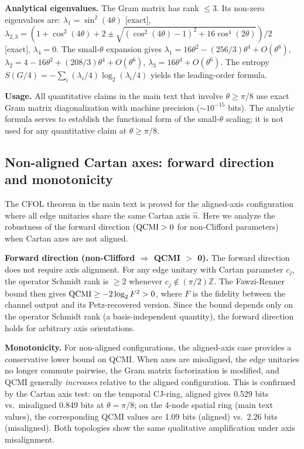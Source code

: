 \documentclass[aps,prl,showpacs]{revtex4-2}
\begin{document}
\textbf{Analytical eigenvalues.} The Gram matrix has rank $\leq 3$. Its non-zero eigenvalues are: $\lambda_1 = \sin^2(4\theta)$ [exact], $\lambda_{2,3} = (1+\cos^2(4\theta)+2 \pm \sqrt{(\cos^2(4\theta)-1)^2 + 16\cos^4(2\theta)})/2$ [exact], $\lambda_4 = 0$. The small-$\theta$ expansion gives $\lambda_1 = 16\theta^2 - (256/3)\theta^4 + O(\theta^6)$, $\lambda_2 = 4 - 16\theta^2 + (208/3)\theta^4 + O(\theta^6)$, $\lambda_3 = 16\theta^4 + O(\theta^6)$. The entropy $S(G/4) = -\sum_i (\lambda_i/4)\log_2(\lambda_i/4)$ yields the leading-order formula.

\textbf{Usage.} All quantitative claims in the main text that involve $\theta \geq \pi/8$ use exact Gram matrix diagonalization with machine precision ($\sim10^{-15}$ bits). The analytic formula serves to establish the functional form of the small-$\theta$ scaling; it is not used for any quantitative claim at $\theta \geq \pi/8$.

\subsection{Non-aligned Cartan axes: forward direction and monotonicity}

The CFOL theorem in the main text is proved for the aligned-axis configuration where all edge unitaries share the same Cartan axis $\hat{n}$. Here we analyze the robustness of the forward direction (${\rm QCMI}>0$ for non-Clifford parameters) when Cartan axes are not aligned.

\textbf{Forward direction (non-Clifford $\Rightarrow$ QCMI $>$ 0).} The forward direction does not require axis alignment. For any edge unitary with Cartan parameter $c_j$, the operator Schmidt rank is $\geq 2$ whenever $c_j \notin (\pi/2)\mathbb{Z}$. The Fawzi-Renner bound then gives ${\rm QCMI} \geq -2\log_2 F^2 > 0$, where $F$ is the fidelity between the channel output and its Petz-recovered version. Since the bound depends only on the operator Schmidt rank (a basis-independent quantity), the forward direction holds for arbitrary axis orientations.

\textbf{Monotonicity.} For non-aligned configurations, the aligned-axis case provides a conservative lower bound on QCMI. When axes are misaligned, the edge unitaries no longer commute pairwise, the Gram matrix factorization is modified, and QCMI generally \textit{increases} relative to the aligned configuration. This is confirmed by the Cartan axis test: on the temporal CJ-ring, aligned gives 0.529 bits vs.\ misaligned 0.849 bits at $\theta=\pi/8$; on the 4-node spatial ring (main text values), the corresponding QCMI values are 1.09 bits (aligned) vs.\ 2.26 bits (misaligned). Both topologies show the same qualitative amplification under axis misalignment.
\end{document}
